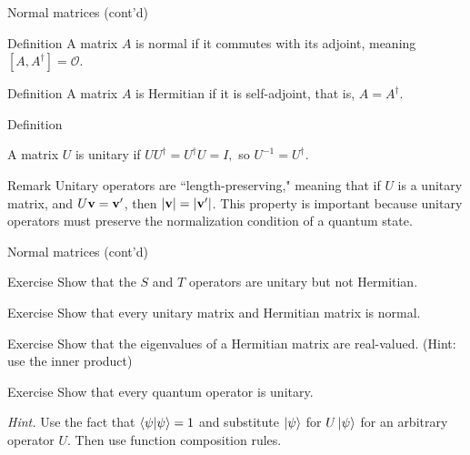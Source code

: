 \documentclass{beamer}
\renewcommand{\O}{\mathcal O}
\renewcommand{\vec}{\textbf}
\begin{document}
\begin{frame}{Normal matrices (cont'd)}

\begin{block}{Definition}
     A matrix $A$ is normal if it commutes with its adjoint, meaning $[A, A^\dagger]=\O$.
\end{block}

\begin{block}{Definition}
A matrix $A$ is Hermitian if it is self-adjoint, that is, $A=A^\dagger.$
\end{block}

\begin{block}{Definition}

A matrix $U$ is unitary if $UU^\dagger = U^\dagger U = I,$ so $U^{-1} = U^\dagger$.

\end{block}

\begin{block}{Remark}
Unitary operators are ``length-preserving," meaning that if $U$ is a unitary matrix, and $U \vec v = \vec v '$, then $|\vec v| = |\vec v'|$. This property is important because unitary operators must preserve the normalization condition of a quantum state.
\end{block}

\end{frame}

\begin{frame}{Normal matrices (cont'd)}

\begin{block}{Exercise}
    Show that the $S$ and $T$ operators are unitary but not Hermitian.
\end{block}

\begin{block}{Exercise}
    Show that every unitary matrix and Hermitian matrix is normal.
\end{block}

\begin{block}{Exercise}
	Show that the eigenvalues of a Hermitian matrix are real-valued. (Hint: use the inner product)
\end{block}

\begin{block}{Exercise}
Show that every quantum operator is unitary.

\textit{Hint.} Use the fact that $\braket{\psi | \psi} = 1$ and substitute $\ket\psi$ for $U\ket\psi$ for an arbitrary operator $U$. Then use function composition rules.

\end{block}

\end{frame}
\end{document}
